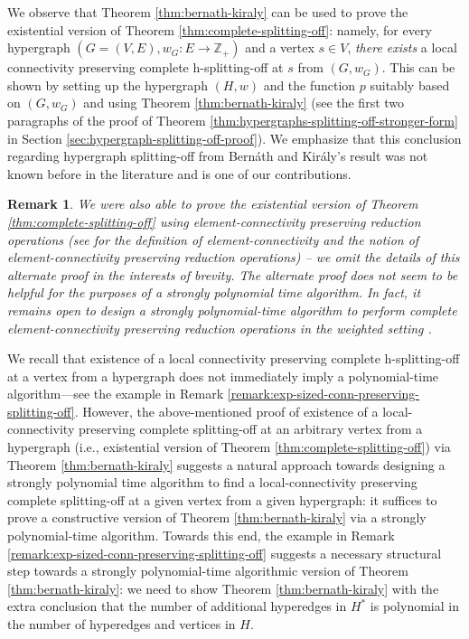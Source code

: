 \documentclass{article}
\newtheorem{remark}{Remark}[section]
\providecommand{\Z}{\mathbb{Z}}
\begin{document}
We observe that Theorem \ref{thm:bernath-kiraly} can be used to prove the existential version of Theorem \ref{thm:complete-splitting-off}: namely, for every hypergraph $(G=(V, E), w_G: E\rightarrow \Z_+)$ and a vertex $s\in V$, \emph{there exists} a local connectivity preserving complete h-splitting-off at $s$ from $(G,w_G)$. This can be shown by setting up the hypergraph $(H,w)$ and the function $p$ suitably based on $(G,w_G)$ and using Theorem \ref{thm:bernath-kiraly} (see the first two paragraphs of the proof of Theorem \ref{thm:hypergraphs-splitting-off-stronger-form} in Section \ref{sec:hypergraph-splitting-off-proof}). 
We emphasize that this conclusion regarding hypergraph splitting-off from Bern\'{a}th and Kir\'{a}ly's result was not known before in the literature and is one of our contributions. 
\begin{remark}
    We were also able to prove the existential version of Theorem \ref{thm:complete-splitting-off} using \emph{element-connectivity preserving reduction operations} \cite{BCCKM-private} (see \cite{CK14} for the definition of element-connectivity and the notion of element-connectivity preserving reduction operations) -- we omit the details of this alternate proof in the interests of brevity. The alternate proof does not seem to be helpful for the purposes of a strongly polynomial time algorithm. In fact, it remains open to design a strongly polynomial-time algorithm to perform \emph{complete} element-connectivity preserving reduction operations in the weighted setting \cite{CK14}. 
\end{remark}

We recall that existence of a local connectivity preserving complete h-splitting-off at a vertex from a hypergraph does not immediately imply a polynomial-time algorithm---see the example in Remark \ref{remark:exp-sized-conn-preserving-splitting-off}. 
However, the above-mentioned proof of 
existence of a local-connectivity preserving complete splitting-off at an arbitrary vertex from a hypergraph (i.e., existential version of Theorem \ref{thm:complete-splitting-off}) 
via Theorem \ref{thm:bernath-kiraly} suggests a natural approach towards designing a strongly polynomial time algorithm to find a local-connectivity preserving complete splitting-off at a given vertex from a given hypergraph: it suffices to prove a constructive version of Theorem \ref{thm:bernath-kiraly} via a strongly polynomial-time algorithm. Towards this end, the example in Remark \ref{remark:exp-sized-conn-preserving-splitting-off} suggests a necessary structural step towards a strongly polynomial-time algorithmic version of Theorem \ref{thm:bernath-kiraly}: we need to show Theorem \ref{thm:bernath-kiraly} with the extra conclusion that the number of additional hyperedges in $H^*$ is polynomial in the number of hyperedges and vertices in $H$. 
\end{document}
